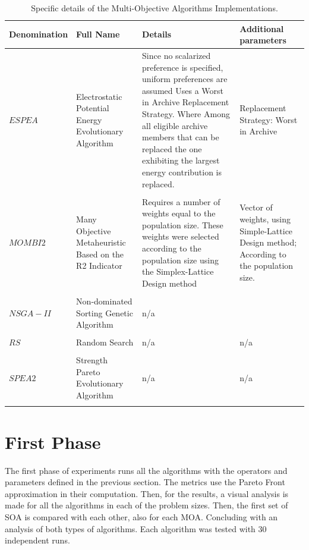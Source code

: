 \begin{table}[H]
    \begin{tabular}{p{}p{}p{}p{}}
    \hline
    Denomination  & Full Name & Details & Additional parameters \\
    \hline
    $ESPEA$         & Electrostatic Potential Energy Evolutionary Algorithm  & Since no scalarized preference is specified, uniform preferences are assumed
    Uses a Worst in Archive Replacement Strategy. 
    Where Among all eligible archive members that can be replaced the one exhibiting the largest energy contribution is replaced. & Replacement Strategy: Worst in Archive \\ \\
    $MOMBI2$        & Many Objective Metaheuristic Based on the R2 Indicator & Requires a number of weights equal to the population size. These weights were selected according to the population size using the Simplex-Lattice Design method & Vector of weights, using Simple-Lattice Design method; According to the population size. \\ \\
    $NSGA-II$       & Non-dominated Sorting Genetic Algorithm               & n/a \\ \\
    $RS$           & Random Search                                          & n/a  & n/a \\ \\ 
    $SPEA2$        & Strength Pareto Evolutionary Algorithm                 & n/a  & n/a \\ \\
    \hline                                                                                                                 
    \end{tabular}
    \caption{Specific details of the Multi-Objective Algorithms Implementations.}
    \label{table:(MOA)_details}
\end{table}

\section{First Phase}
\label{sec:first_phase}

The first phase of experiments runs all the algorithms with the operators and parameters defined in the previous section. The metrics use the Pareto Front approximation in their computation. Then, for the results, a visual analysis is made for all the algorithms in each of the problem sizes. Then, the first set of SOA is compared with each other, also for each MOA. Concluding with an analysis of both types of algorithms. Each algorithm was tested with 30 independent runs.\\

